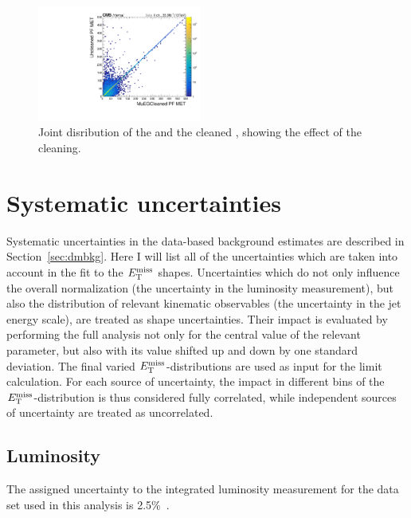 \begin{figure}[hbtp]
  \centering
  \includegraphics[width=0.48\textwidth]{figures/ll_metAltVsUncleaned.pdf}
  \caption{
    Joint disribution of the \met and the cleaned \met, showing the effect of the cleaning.
  }
  \label{fig:met_control2}
\end{figure}

\section{Systematic uncertainties}
\label{sec:dmsyst}
Systematic uncertainties in the data-based background estimates are described 
in Section~\ref{sec:dmbkg}.
Here I will list all of the uncertainties which are taken into
account in the fit to the $E_\mathrm{T}^{\mathrm{miss}}$ shapes. 
Uncertainties which do not only influence the overall normalization
(\eg the uncertainty in the luminosity measurement), but also the
distribution of relevant kinematic observables (\eg the uncertainty in
the jet energy scale), are treated as shape uncertainties. Their
impact is evaluated by performing the full analysis not only for the
central value of the relevant parameter, but also with its value
shifted up and down by one standard deviation. The final varied
$E_\mathrm{T}^{\mathrm{miss}}$-distributions are used as input for the limit calculation. For
each source of uncertainty, the impact in different bins of the
$E_\mathrm{T}^{\mathrm{miss}}$-distribution is thus considered fully correlated, while
independent sources of uncertainty are treated as uncorrelated. 

\subsection{Luminosity}

The assigned uncertainty to the integrated luminosity measurement for
the data set used in this analysis is 2.5\%~\cite{CMS:2017sdi}.

